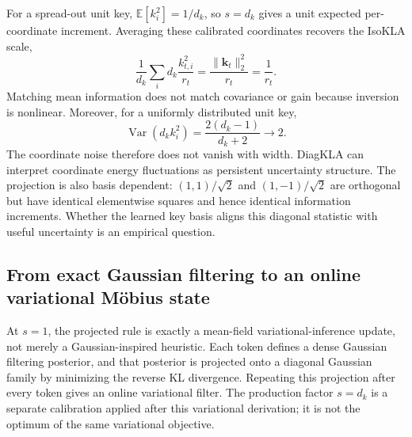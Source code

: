 \documentclass[11pt]{article}
\newcommand{\vct}[1]{\boldsymbol{#1}}
\begin{document}
For a spread-out unit key, $\mathbb{E}[k_i^2]=1/d_k$, so $s=d_k$ gives a unit expected
per-coordinate increment. Averaging these calibrated coordinates recovers the IsoKLA scale,
\begin{equation}
  \frac{1}{d_k}\sum_i d_k\frac{k_{t,i}^2}{r_t}
  = \frac{\lVert\vct{k}_t\rVert_2^2}{r_t}
  = \frac{1}{r_t}.
  \label{eq:discussion-diag-iso-average}
\end{equation}
Matching mean information does not match covariance or gain because inversion is nonlinear.
Moreover, for a uniformly distributed unit key,
\begin{equation}
  \operatorname{Var}(d_k k_i^2)
  = \frac{2(d_k-1)}{d_k+2}
  \longrightarrow 2.
  \label{eq:discussion-coordinate-information-variance}
\end{equation}
The coordinate noise therefore does not vanish with width. DiagKLA can interpret coordinate
energy fluctuations as persistent uncertainty structure. The projection is also basis
dependent: $(1,1)/\sqrt{2}$ and $(1,-1)/\sqrt{2}$ are orthogonal but have identical elementwise
squares and hence identical information increments. Whether the learned key basis aligns this
diagonal statistic with useful uncertainty is an empirical question.

\subsection{From exact Gaussian filtering to an online variational M\"obius state}
\label{subsec:discussion-projection-derivation}

At $s=1$, the projected rule is exactly a mean-field variational-inference update, not merely a
Gaussian-inspired heuristic. Each token defines a dense Gaussian filtering posterior, and that
posterior is projected onto a diagonal Gaussian family by minimizing the reverse KL divergence.
Repeating this projection after every token gives an online variational filter. The production
factor $s=d_k$ is a separate calibration applied after this variational derivation; it is not the
optimum of the same variational objective.
\end{document}
